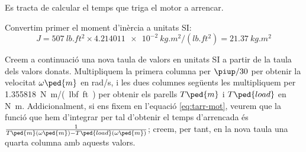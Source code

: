 \begin{exemple}
 Es tracta de calcular el temps que triga el motor a arrencar.

Convertim primer el moment d'inèrcia a unitats SI:
\[
    J =  \qty{507}{lb.ft^2} \times \qty{4,214011e-2}{kg.m^2/(lb.ft^2)}
    = \qty{21,37}{kg.m^2}
\]

Creem a continuació una nova taula de valors en unitats SI a partir de la taula dels valors donats. Multipliquem la primera columna per $\piup/30$ per obtenir la velocitat $\omega\ped{m}$ en \unit{rad/s}, i les dues columnes següents les multipliquem per \qty{1,355818}{N.m/(lbf.ft)} per obtenir els parells $T\ped{m}$ i $T\ped{load}$ en \unit{N.m}. Addicionalment, si ens fixem en l'equació \eqref{eq:tarr-mot}, veurem que la funció que hem d'integrar per tal d'obtenir el temps d'arrencada és $\frac{1}{T\ped{m}(\omega\ped{m})-T\ped{load}(\omega\ped{m})}$; creem, per tant, en la nova taula una quarta columna amb aquests valors.


\end{exemple}
